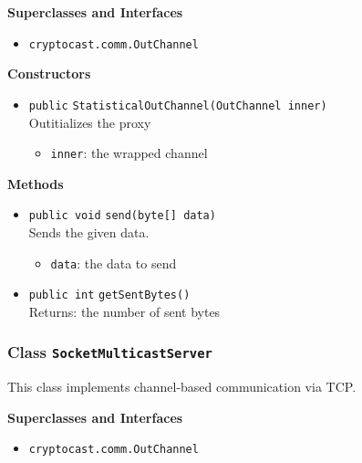 \textbf{Superclasses and Interfaces}
\begin{itemize}
\item \lstinline|cryptocast.comm.OutChannel|
\end{itemize}



\textbf{Constructors}
\begin{itemize}
\item \lstinline|public| \lstinline|StatisticalOutChannel|\lstinline|(OutChannel inner)|\\
Outitializes the proxy
\begin{itemize}
\item \lstinline|inner|: the wrapped channel
\end{itemize}



\end{itemize}


\textbf{Methods}
\begin{itemize}
\item \lstinline|public void| \lstinline|send|\lstinline|(byte[] data)|\\
Sends the given data.
\begin{itemize}
\item \lstinline|data|: the data to send
\end{itemize}



\item \lstinline|public int| \lstinline|getSentBytes|\lstinline|()|\\
Returns: the number of sent bytes



\end{itemize}

\subsubsection{Class \lstinline|SocketMulticastServer|}
This class implements channel-based communication via TCP. \\



\textbf{Superclasses and Interfaces}
\begin{itemize}
\item \lstinline|cryptocast.comm.OutChannel|
\end{itemize}



